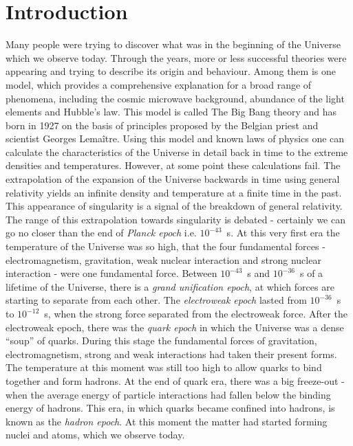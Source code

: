 \chapter*{Introduction}
Many people were trying to discover what was in the beginning of the Universe which we observe today.
Through the years, more or less successful theories were appearing and trying to describe its origin and behaviour.
Among them is one model, which provides a comprehensive explanation for a broad range of phenomena, including the cosmic microwave background, abundance of the light elements and Hubble's law.
This model is called The Big Bang theory and has born in 1927 on the basis of principles proposed by the Belgian priest and scientist Georges Lema{\^i}tre.
Using this model and known laws of physics one can calculate the characteristics of the Universe in detail back in time to the extreme densities and temperatures.
However, at some point these calculations fail.
The extrapolation of the expansion of the Universe backwards in time using general relativity yields an infinite density and temperature at a finite time in the past.
This appearance of singularity is a signal of the breakdown of general relativity.
The range of this extrapolation towards singularity is debated - certainly we can go no closer than the end of \textit{Planck epoch} i.e. $10^{-43}$~s.
At this very first era the temperature of the Universe was so high, that the four fundamental forces - electromagnetism, gravitation, weak nuclear interaction and strong nuclear interaction - were one fundamental force.
Between $10^{-43}$~s and $10^{-36}$~s of a lifetime of the Universe, there is a \textit{grand unification epoch}, at which forces are starting to separate from each other.
The \textit{electroweak epoch} lasted from $10^{-36}$~s to $10^{-12}$~s, when the strong force separated from the electroweak force.
After the electroweak epoch, there was the \textit{quark epoch} in which the Universe was a dense ``soup'' of quarks.
During this stage the fundamental forces of gravitation, electromagnetism, strong and weak interactions had taken their present forms. 
The temperature at this moment was still too high to allow quarks to bind together and form hadrons.
At the end of quark era, there was a big freeze-out - when the average energy of particle interactions had fallen below the binding energy of hadrons.
This era, in which quarks became confined into hadrons, is known as the \textit{hadron epoch}.
At this moment the matter had started forming nuclei and atoms, which we observe today.

